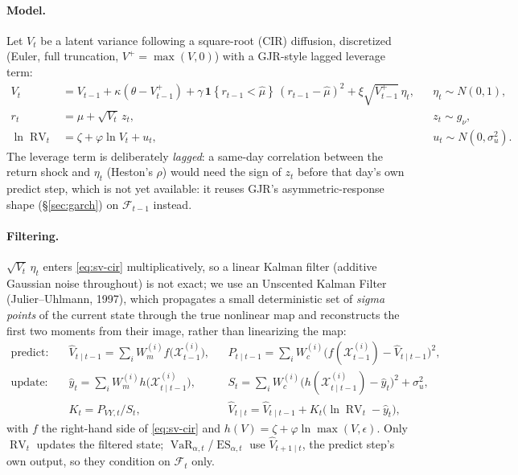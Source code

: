 \documentclass[11pt,a4paper]{article}
\newcommand{\Ind}[1]{\mathbf{1}\!\left\{#1\right\}}
\newcommand{\VaR}{\operatorname{VaR}}
\newcommand{\ES}{\operatorname{ES}}
\newcommand{\RV}{\operatorname{RV}}
\newcommand{\Fcal}{\mathcal{F}}
\begin{document}
\paragraph{Model.} Let $V_t$ be a latent variance following a square-root
(CIR) diffusion, discretized (Euler, full truncation, $V^+=\max(V,0)$) with a
GJR-style lagged leverage term:
\begin{align}
  V_t &= V_{t-1} + \kappa(\theta - V_{t-1}^+)
         + \gamma\,\Ind{r_{t-1}<\hat\mu}\,(r_{t-1}-\hat\mu)^2
         + \xi\sqrt{V_{t-1}^+}\,\eta_t, && \eta_t\sim N(0,1), \label{eq:sv-cir}\\
  r_t &= \mu + \sqrt{V_t}\,z_t, && z_t\sim g_\nu, \\
  \ln\RV_t &= \zeta + \varphi\ln V_t + u_t, && u_t\sim N(0,\sigma_u^2).
\end{align}
The leverage term is deliberately \emph{lagged}: a same-day correlation
between the return shock and $\eta_t$ (Heston's $\rho$) would need the sign
of $z_t$ before that day's own predict step, which is not yet available: it
reuses GJR's asymmetric-response shape (\S\ref{sec:garch}) on $\Fcal_{t-1}$
instead.

\paragraph{Filtering.} $\sqrt{V_t}\,\eta_t$ enters \eqref{eq:sv-cir}
multiplicatively, so a linear Kalman filter (additive Gaussian noise
throughout) is not exact; we use an Unscented Kalman Filter
(Julier--Uhlmann, 1997), which propagates a small deterministic set of
\emph{sigma points} of the current state through the true nonlinear map and
reconstructs the first two moments from their image, rather than
linearizing the map:
\begin{align}
  \text{predict:}\quad & \hat V_{t\mid t-1} = \sum_i W_m^{(i)} f\big(\mathcal X_{t-1}^{(i)}\big), &&
    P_{t\mid t-1} = \sum_i W_c^{(i)} \big(f(\mathcal X_{t-1}^{(i)}) - \hat V_{t\mid t-1}\big)^2, \\
  \text{update:}\quad & \hat y_{t} = \sum_i W_m^{(i)} h\big(\mathcal X_{t\mid t-1}^{(i)}\big), &&
    S_t = \sum_i W_c^{(i)}\big(h(\mathcal X^{(i)}_{t\mid t-1}) - \hat y_t\big)^2 + \sigma_u^2, \\
  & K_t = P_{VY,t}/S_t, && \hat V_{t\mid t} = \hat V_{t\mid t-1} + K_t\big(\ln\RV_t - \hat y_t\big),
\end{align}
with $f$ the right-hand side of \eqref{eq:sv-cir} and
$h(V)=\zeta+\varphi\ln\max(V,\epsilon)$. Only $\RV_t$ updates the filtered
state; $\VaR_{\alpha,t}$/$\ES_{\alpha,t}$ use $\hat V_{t+1\mid t}$, the
predict step's own output, so they condition on $\Fcal_t$ only.
\end{document}
